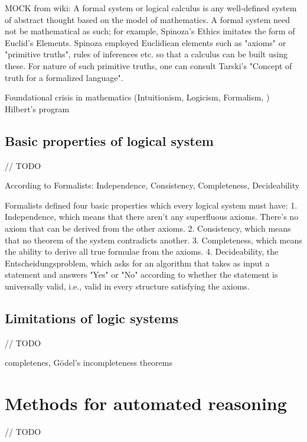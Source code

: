 \documentclass[article]{aaltoseries}
\begin{document}
MOCK from wiki: A formal system or logical calculus is any well-defined system of abstract thought based on the model of mathematics. A formal system need not be mathematical as such; for example, Spinoza's Ethics imitates the form of Euclid's Elements. Spinoza employed Euclidiean elements such as "axioms" or "primitive truths", rules of inferences etc. so that a calculus can be built using these. For nature of such primitive truths, one can consult Tarski's "Concept of truth for a formalized language".

Foundational crisis in mathematics (Intuitionism, Logicism, Formalism, ) Hilbert’s program


\subsection{Basic properties of logical system}
\label{sec:logic_properties}
// TODO

According to Formalists: Independence, Consistency, Completeness, Decideability

Formalists defined four basic properties which every logical system must have:
1. Independence, which means that there aren’t any superfluous axioms. There’s no axiom that can be derived from the other axioms.
2. Consistency, which means that no theorem of the system contradicts another.
3. Completeness, which means the ability to derive all true formulae from the axioms.
4. Decideability, the Entscheidungsproblem, which asks for an algorithm that takes as input a statement and answers "Yes" or "No" according to whether the statement is universally valid, i.e., valid in every structure satisfying the axioms.


\subsection{Limitations of logic systems}
\label{sec:limitations}
// TODO

completenes, Gödel's incompleteness theorems



\section{Methods for automated reasoning}
\label{sec:auto_reasoning}
// TODO
\end{document}
